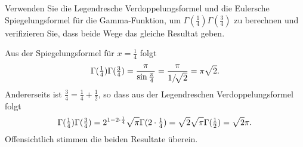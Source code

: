 Verwenden Sie die Legendresche Verdoppelungsformel und
die Eulersche Spiegelungsformel für die Gamma-Funktion,
um $\Gamma(\frac14)\Gamma(\frac34)$ zu berechnen und
verifizieren Sie, dass beide Wege das gleiche Resultat geben.

\begin{loesung}
Aus der Spiegelungsformel für $x=\frac14$ folgt
\[
\Gamma({\textstyle\frac14})\Gamma({\textstyle\frac34})
=
\frac{\pi}{\sin\frac{\pi}4}
=
\frac{\pi}{1/\!\sqrt{\mathstrut 2}}
=
\pi\sqrt{\mathstrut 2}.
\]
Andererseits ist $\frac34=\frac14+\frac12$, so dass aus der Legendreschen
Verdoppelungsformel folgt
\[
\Gamma({\textstyle\frac14})\Gamma({\textstyle\frac34})
=
2^{1-2\cdot \frac14}\sqrt{\mathstrut\pi}\Gamma(2\cdot {\textstyle\frac14})
=
\sqrt{\mathstrut 2}
\sqrt{\mathstrut \pi}\Gamma({\textstyle\frac12})
=
\sqrt{\mathstrut 2}
\pi.
\]
Offensichtlich stimmen die beiden Resultate überein.
\end{loesung}
